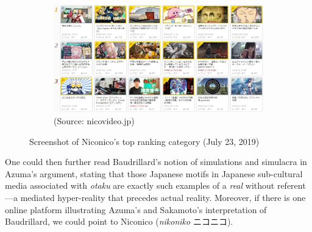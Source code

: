 \documentclass[10pt,british,A4paper,oneside]{memoir}
\begin{document}
\begin{figure}[!htb]
 \centering
 \begin{subfigure}[b]{0.75\textwidth}
 \includegraphics[width=\textwidth]{images/2channel/niconico.jpg}
 \caption*{(Source: nicovideo.jp)}
 \end{subfigure}
 \caption{Screenshot of Niconico's top ranking category (July 23, 2019)}\label{fig:nicotop}
\end{figure}

One could then further read Baudrillard's notion of simulations and
simulacra in Azuma's argument, stating that those Japanese motifs in
Japanese sub-cultural media associated with \emph{otaku} are exactly
such examples of a \emph{real} without referent---a mediated
hyper-reality that precedes actual reality. Moreover, if there is one
online platform illustrating Azuma's and Sakamoto's interpretation of
Baudrillard, we could point to Niconico (\emph{nikoniko} ニコニコ).
\end{document}
